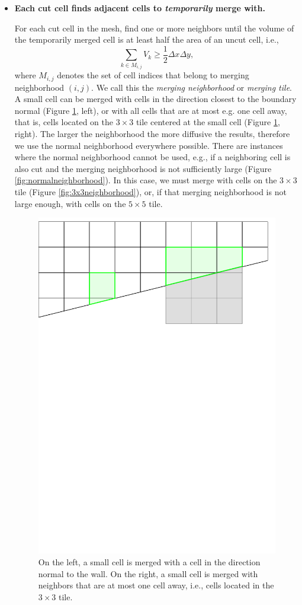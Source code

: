 \begin{itemize}
\item
{\bf Each cut cell finds adjacent cells to {\em temporarily} merge with.}

\vspace*{.1in}
For each cut cell in the mesh, find  one or more neighbors until the
volume of the temporarily merged cell is at least half the area of an uncut cell, i.e., 
\begin{equation} \label{eq:vmerge}
\sum_{k \in M_{i,j}} V_{k} \geq \frac{1}{2}\Delta x\Delta y,
\end{equation}
where $M_{i,j}$ denotes the set of cell indices that belong to merging neighborhood $(i,j)$.
We call this the 
{\em  merging neighborhood} or {\em merging tile}.  
A small cell can be merged with cells in the direction closest to the boundary normal (Figure \ref{fig:neighborhoods}, left), or with all cells that are at most e.g. one cell away, that is, cells located on the $3 \times 3$ tile centered at the small cell (Figure \ref{fig:neighborhoods}, right).
The larger the neighborhood the more diffusive the results, therefore we use the normal neighborhood everywhere possible.
There are instances where the normal neighborhood cannot be used, e.g., if a neighboring cell is also cut and the
merging neighborhood is not sufficiently large (Figure \ref{fig:normalneighborhood}).  In this case, we must merge with cells on the $3\times3$ tile (Figure \ref{fig:3x3neighborhood}), or, if that merging neighborhood is not large enough, with cells on the $5 \times 5$ tile.

\begin{figure}
    \centering
    \includegraphics[width=0.5\linewidth]{figs/neighborhoods.pdf}
    \caption{\sf On the left, a small cell is merged with a cell in the direction 
    normal to  the wall.  On the right, a small cell is merged with neighbors that are at most one cell away, i.e., cells located in the $3\times3$ tile.}
    \label{fig:neighborhoods}
\end{figure}


\end{itemize}

